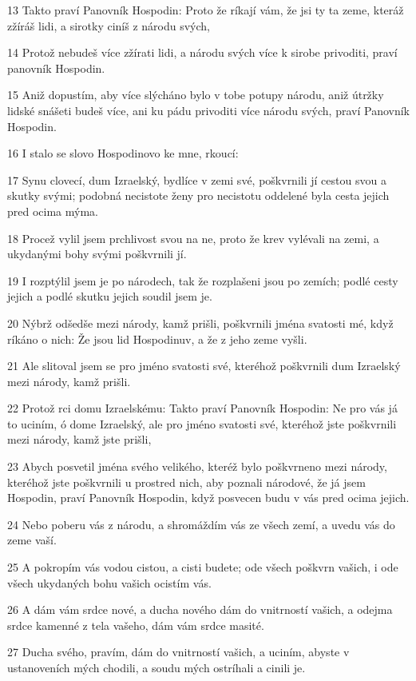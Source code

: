 \par 13 Takto praví Panovník Hospodin: Proto že ríkají vám, že jsi ty ta zeme, kteráž zžíráš lidi, a sirotky ciníš z národu svých,
\par 14 Protož nebudeš více zžírati lidi, a národu svých více k sirobe privoditi, praví panovník Hospodin.
\par 15 Aniž dopustím, aby více slýcháno bylo v tobe potupy národu, aniž útržky lidské snášeti budeš více, ani ku pádu privoditi více národu svých, praví Panovník Hospodin.
\par 16 I stalo se slovo Hospodinovo ke mne, rkoucí:
\par 17 Synu clovecí, dum Izraelský, bydlíce v zemi své, poškvrnili jí cestou svou a skutky svými; podobná necistote ženy pro necistotu oddelené byla cesta jejich pred ocima mýma.
\par 18 Procež vylil jsem prchlivost svou na ne, proto že krev vylévali na zemi, a ukydanými bohy svými poškvrnili jí.
\par 19 I rozptýlil jsem je po národech, tak že rozplašeni jsou po zemích; podlé cesty jejich a podlé skutku jejich soudil jsem je.
\par 20 Nýbrž odšedše mezi národy, kamž prišli, poškvrnili jména svatosti mé, když ríkáno o nich: Že jsou lid Hospodinuv, a že z jeho zeme vyšli.
\par 21 Ale slitoval jsem se pro jméno svatosti své, kteréhož poškvrnili dum Izraelský mezi národy, kamž prišli.
\par 22 Protož rci domu Izraelskému: Takto praví Panovník Hospodin: Ne pro vás já to uciním, ó dome Izraelský, ale pro jméno svatosti své, kteréhož jste poškvrnili mezi národy, kamž jste prišli,
\par 23 Abych posvetil jména svého velikého, kteréž bylo poškvrneno mezi národy, kteréhož jste poškvrnili u prostred nich, aby poznali národové, že já jsem Hospodin, praví Panovník Hospodin, když posvecen budu v vás pred ocima jejich.
\par 24 Nebo poberu vás z národu, a shromáždím vás ze všech zemí, a uvedu vás do zeme vaší.
\par 25 A pokropím vás vodou cistou, a cisti budete; ode všech poškvrn vašich, i ode všech ukydaných bohu vašich ocistím vás.
\par 26 A dám vám srdce nové, a ducha nového dám do vnitrností vašich, a odejma srdce kamenné z tela vašeho, dám vám srdce masité.
\par 27 Ducha svého, pravím, dám do vnitrností vašich, a uciním, abyste v ustanoveních mých chodili, a soudu mých ostríhali a cinili je.
